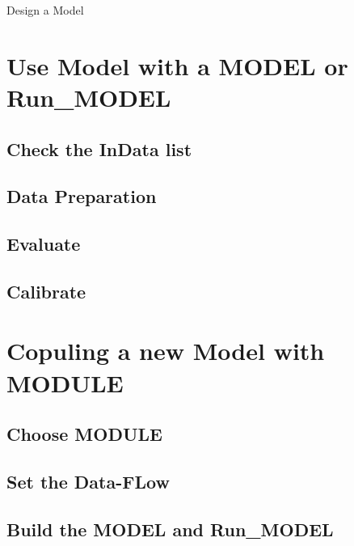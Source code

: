 \documentclass[
]{book}
\begin{document}
Design a Model

\hypertarget{use-model-with-a-model-or-run_model}{%
\section{Use Model with a MODEL or Run\_MODEL}\label{use-model-with-a-model-or-run_model}}

\hypertarget{check-the-indata-list}{%
\subsection{Check the InData list}\label{check-the-indata-list}}

\hypertarget{data-preparation}{%
\subsection{Data Preparation}\label{data-preparation}}

\hypertarget{evaluate}{%
\subsection{Evaluate}\label{evaluate}}

\hypertarget{calibrate}{%
\subsection{Calibrate}\label{calibrate}}

\hypertarget{copuling-a-new-model-with-module}{%
\section{Copuling a new Model with MODULE}\label{copuling-a-new-model-with-module}}

\hypertarget{choose-module}{%
\subsection{Choose MODULE}\label{choose-module}}

\hypertarget{set-the-data-flow}{%
\subsection{Set the Data-FLow}\label{set-the-data-flow}}

\hypertarget{build-the-model-and-run_model}{%
\subsection{Build the MODEL and Run\_MODEL}\label{build-the-model-and-run_model}}
\end{document}
